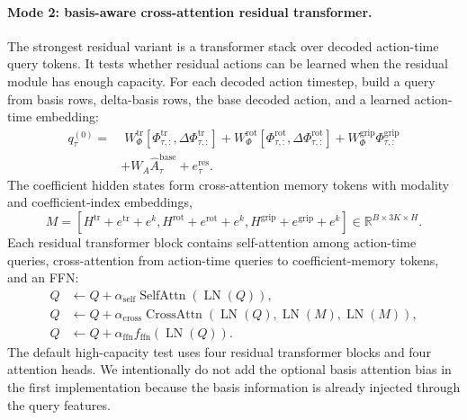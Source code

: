 \documentclass[10pt,twocolumn,letterpaper]{article}
\begin{document}
\paragraph{Mode 2: basis-aware cross-attention residual transformer.}
The strongest residual variant is a transformer stack over decoded action-time query tokens. It tests whether residual actions can be learned when the residual module has enough capacity. For each decoded action timestep, build a query from basis rows, delta-basis rows, the base decoded action, and a learned action-time embedding:
\begin{align}
q^{(0)}_\tau
=&\;W^{\mathrm{tr}}_{\Phi}
\left[\Phi^{\mathrm{tr}}_{\tau,:},\Delta\Phi^{\mathrm{tr}}_{\tau,:}\right]
+W^{\mathrm{rot}}_{\Phi}
\left[\Phi^{\mathrm{rot}}_{\tau,:},\Delta\Phi^{\mathrm{rot}}_{\tau,:}\right]
+W^{\mathrm{grip}}_{\Phi}\Phi^{\mathrm{grip}}_{\tau,:}
\nonumber\\
&+W_A\hat A^{\mathrm{base}}_{\tau}+e_{\tau}^{\mathrm{res}}.
\end{align}
The coefficient hidden states form cross-attention memory tokens with modality and coefficient-index embeddings,
\begin{equation}
M=
\left[
H^{\mathrm{tr}}+e^{\mathrm{tr}}+e^{k},
H^{\mathrm{rot}}+e^{\mathrm{rot}}+e^{k},
H^{\mathrm{grip}}+e^{\mathrm{grip}}+e^{k}
\right]
\in\mathbb{R}^{B\times 3K\times H}.
\end{equation}
Each residual transformer block contains self-attention among action-time queries, cross-attention from action-time queries to coefficient-memory tokens, and an FFN:
\begin{align}
Q &\leftarrow Q+
\alpha_{\mathrm{self}}\operatorname{SelfAttn}(\operatorname{LN}(Q)),\\
Q &\leftarrow Q+
\alpha_{\mathrm{cross}}\operatorname{CrossAttn}(\operatorname{LN}(Q),\operatorname{LN}(M),\operatorname{LN}(M)),\\
Q &\leftarrow Q+
\alpha_{\mathrm{ffn}}f_{\mathrm{ffn}}(\operatorname{LN}(Q)).
\end{align}
The default high-capacity test uses four residual transformer blocks and four attention heads. We intentionally do not add the optional basis attention bias in the first implementation because the basis information is already injected through the query features.
\end{document}
